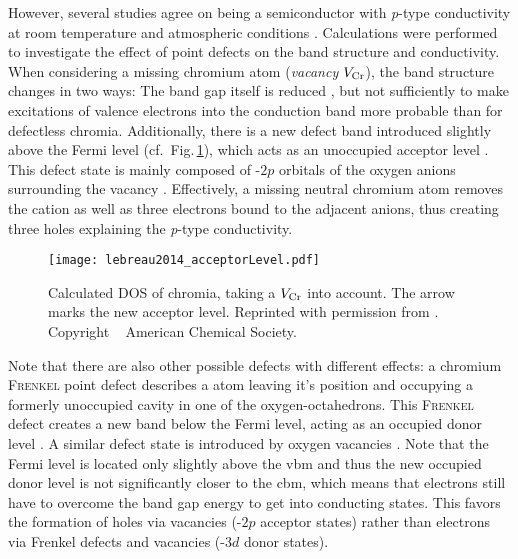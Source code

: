 However, several studies agree on  being a semiconductor with \textit{p}-type conductivity
at room temperature and atmospheric conditions
    \cite{kofstad1980,cheng1996,caricato2010,lebreau2014,mi2018,singh2019,polyakov2022a}.
Calculations were performed to investigate the effect of point defects on the band structure and conductivity.
When considering a missing chromium atom (\emph{vacancy} $V_{\ce{Cr}}$), the band structure changes in two ways:
The band gap itself is reduced \cite{mi2018}, but not sufficiently to make excitations of valence electrons into the conduction band more probable than for defectless chromia.
Additionally, there is a new defect band introduced slightly above the Fermi level (cf.\ Fig.\,\ref{Fig:lebreau2014_acceptorLevel}), which acts as an unoccupied acceptor level
    \cite{mi2018}.
This defect state is mainly composed of -$2p$ orbitals of the oxygen anions surrounding the vacancy
    \cite{lebreau2014}.
Effectively, a missing neutral chromium atom removes the  cation as well as three electrons bound to the adjacent  anions, thus creating three holes \cite{lebreau2014} explaining the \textit{p}-type conductivity.
\begin{figure}
    \centering
    \texttt{[image: lebreau2014\_acceptorLevel.pdf]}
    \caption{Calculated \acrfull{DOS} of chromia, taking a $V_{\ce{Cr}}$ into account.
    The arrow marks the new acceptor level.
    Reprinted with permission from \textcite{lebreau2014}. Copyright \textcopyright\ \citeyear{lebreau2014} American Chemical Society.}
    \label{Fig:lebreau2014_acceptorLevel}
\end{figure}

Note that there are also other possible defects with different effects:
a chromium \textsc{Frenkel} point defect describes a  atom leaving it's position and occupying a formerly unoccupied cavity in one of the oxygen-octahedrons.
This \textsc{Frenkel} defect creates a new band below the Fermi level, acting as an occupied donor level
    \cite{lebreau2014}.
A similar defect state is introduced by oxygen vacancies
    \cite{mi2018}.
Note that the Fermi level is located only slightly above the \gls{vbm} and thus the new occupied donor level is not significantly closer to the \gls{cbm}, which means that electrons still have to overcome the band gap energy to get into conducting states.
This favors the formation of holes via  vacancies (-$2p$ acceptor states) rather than electrons via  Frenkel defects and  vacancies (-$3d$ donor states).

